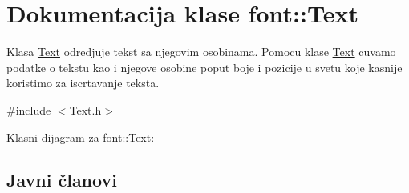 \hypertarget{classfont_1_1Text}{}\section{Dokumentacija klase font\+:\+:Text}
\label{classfont_1_1Text}


Klasa \hyperlink{classfont_1_1Text}{Text} odredjuje tekst sa njegovim osobinama. Pomocu klase \hyperlink{classfont_1_1Text}{Text} cuvamo podatke o tekstu kao i njegove osobine poput boje i pozicije u svetu koje kasnije koristimo za iscrtavanje teksta.  




{\ttfamily \#include $<$Text.\+h$>$}



Klasni dijagram za font\+:\+:Text\+:
\subsection*{Javni članovi}
